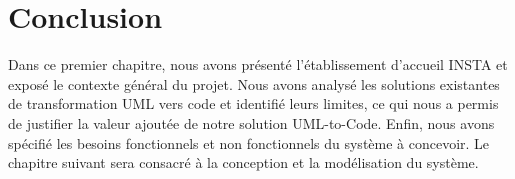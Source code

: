 \section*{Conclusion}

Dans ce premier chapitre, nous avons présenté l'établissement d'accueil INSTA et exposé le contexte général du projet. Nous avons analysé les solutions existantes de transformation UML vers code et identifié leurs limites, ce qui nous a permis de justifier la valeur ajoutée de notre solution UML-to-Code\fnGitHub. Enfin, nous avons spécifié les besoins fonctionnels et non fonctionnels du système à concevoir. Le chapitre suivant sera consacré à la conception et la modélisation du système.